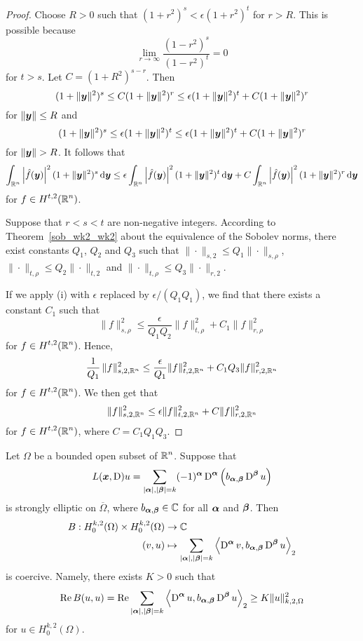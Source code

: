 \begin{proof}
 Choose $R>0$ such that $(1+r^2)^s < \epsilon (1+r^2)^t$ for $r> R$.
This is possible because
\[
\lim_{r\rightarrow \infty} \frac{(1-r^2)^s}{(1-r^2)^t} = 0
\]
for $t>s$.  Let $C= (1+R^2)^{s-r}$.  Then
\[
(1+\|{\bm{y}}\|^2)^s \leq C (1+\|{\bm{y}}\|^2)^r \leq
\epsilon (1+\|{\bm{y}}\|^2)^t + C (1+\|{\bm{y}}\|^2)^r
\]
for $\|{\bm{y}}\|\leq R$ and
\[
(1+\|{\bm{y}}\|^2)^s \leq \epsilon (1+\|{\bm{y}}\|^2)^t \leq
\epsilon (1+\|{\bm{y}}\|^2)^t + C (1+\|{\bm{y}}\|^2)^r
\]
for $\|\VEC{y}\|> R$.  It follows that
\[
\int_{\mathbb{R}^n} \left|\hat{f}({\bm{y}})\right|^2 (1+\|{\bm{y}}\|^2)^s \,\mathrm{d}{{\bm{y}}}
\leq \epsilon \int_{\mathbb{R}^n} \left|\hat{f}({\bm{y}})\right|^2
(1+\|{\bm{y}}\|^2)^t \,\mathrm{d}{{\bm{y}}}
+ C \int_{\mathbb{R}^n} \left|\hat{f}({\bm{y}})\right|^2
(1+\|{\bm{y}}\|^2)^r \,\mathrm{d}{{\bm{y}}}
\]
for $\displaystyle f \in H^{t,2}(\mathbb{R}^n)$.

  Suppose that $r<s<t$ are non-negative integers.
According to Theorem~\ref{sob_wk2_wk2} about the equivalence of the
Sobolev norms, there exist constants $Q_1$, $Q_2$ and $Q_3$ such that
$\|\cdot\|_{s,2} \leq Q_1 \|\cdot\|_{s,\rho}$,
$\|\cdot\|_{t,\rho} \leq Q_2 \|\cdot\|_{t,2}$ and
$\|\cdot\|_{t,\rho} \leq Q_3 \|\cdot\|_{r,2}$.

If we apply (i) with $\epsilon$ replaced by $\epsilon/(Q_1 Q_1)$, we
find that there exists a constant $C_1$ such that
\[
\|f\|_{s,\rho}^2 \leq \frac{\epsilon}{Q_1 Q_2} \| f\|_{t,\rho}^2
+ C_1 \| f \|_{r,\rho}^2
\]
for $\displaystyle f \in H^{t,2}(\mathbb{R}^n)$.  Hence,
\[
\frac{1}{Q_1}\, \|f\|_{s,2,\mathbb{R}^n}^2 \leq \frac{\epsilon}{Q_1}
\| f\|_{t,2,\mathbb{R}^n}^2 + C_1 Q_3 \| f \|_{r,2,\mathbb{R}^n}^2
\]
for $\displaystyle f \in H^{t,2}(\mathbb{R}^n)$.  We then get that
\[
\|f\|_{s,2,\mathbb{R}^n}^2 \leq \epsilon \| f\|_{t,2,\mathbb{R}^n}^2 + C \| f \|_{r,2,\mathbb{R}^n}^2
\]
for $\displaystyle f \in H^{t,2}(\mathbb{R}^n)$, where $C= C_1 Q_1 Q_3$.
\end{proof}

\begin{lemma} \label{ell_garding2}
Let $\Omega$ be a bounded open subset of $\displaystyle \mathbb{R}^n$.  Suppose that
\[
L({\bm{x}},\operatorname{D})u = \sum_{|{\bm{\alpha}}|,|{\bm{\beta}}|= k} (-1)^{{\bm{\alpha}}}
\operatorname{D}^{{\bm{\alpha}}} \left( b_{{\bm{\alpha}},{\bm{\beta}}}
\operatorname{D}^{{\bm{\beta}}} u\right)
\]
is strongly elliptic on $\overline{\Omega}$, where
$b_{{\bm{\alpha}},{\bm{\beta}}} \in \mathbb{C}$ for all ${\bm{\alpha}}$ and
${\bm{\beta}}$.  Then
\[
\begin{split}
B : H^{k,2}_0(\Omega) \times H^{k,2}_0(\Omega) & \rightarrow \mathbb{C} \\
(v,u) &\mapsto
\sum_{|{\bm{\alpha}}|,|{\bm{\beta}}|= k}
\left\langle{\operatorname{D}^{{\bm{\alpha}}} v} , {b_{{\bm{\alpha}},{\bm{\beta}}} \operatorname{D}^{{\bm{\beta}}} u}\right\rangle_2
\end{split}
\]
is coercive.  Namely, there exists $K>0$ such that
\[
\operatorname{Re} B(u,u) = \operatorname{Re} \sum_{|{\bm{\alpha}}|,|{\bm{\beta}}|= k}
\left\langle{\operatorname{D}^{{\bm{\alpha}}} u} , {b_{{\bm{\alpha}},{\bm{\beta}}}
\operatorname{D}^{{\bm{\beta}}} u}\right\rangle_2 \geq K \|u\|_{k,2,\Omega}^2
\]
for $\displaystyle u  \in H^{k,2}_0(\Omega)$.
\end{lemma}

